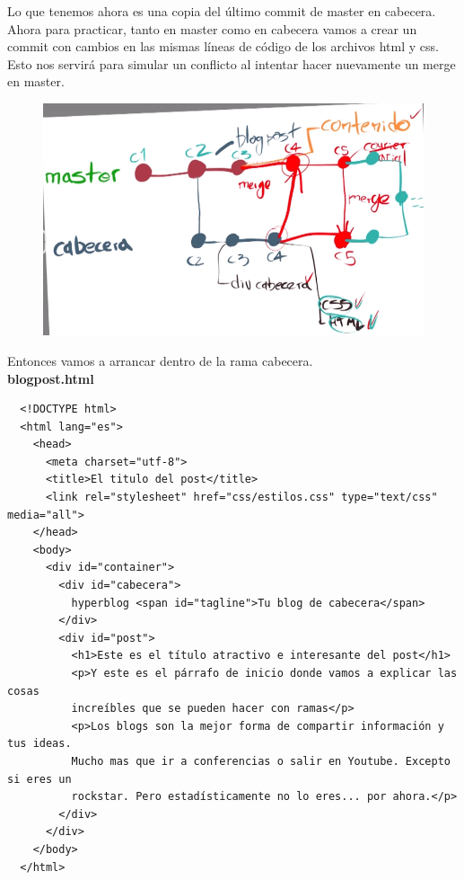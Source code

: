 \documentclass{article}
\begin{document}
Lo que tenemos ahora es una copia del último commit de master en cabecera.
Ahora para practicar, tanto en master como en cabecera vamos a crear un commit
con cambios en las mismas líneas de código de los archivos html y css. Esto nos
servirá para simular un conflicto al intentar hacer nuevamente un merge en
master.

\newpage

\begin{figure}[h!]
  \centering
  \includegraphics[scale=0.75]{./Pictures/171_commits_cabecera.png}
\end{figure}

Entonces vamos a arrancar dentro de la rama cabecera.\\

\textbf{blogpost.html}
\begin{verbatim}
  <!DOCTYPE html>
  <html lang="es">
    <head>
      <meta charset="utf-8">
      <title>El titulo del post</title>
      <link rel="stylesheet" href="css/estilos.css" type="text/css" media="all">
    </head>
    <body>
      <div id="container">
        <div id="cabecera">
          hyperblog <span id="tagline">Tu blog de cabecera</span>
        </div>
        <div id="post">
          <h1>Este es el título atractivo e interesante del post</h1>
          <p>Y este es el párrafo de inicio donde vamos a explicar las cosas
          increíbles que se pueden hacer con ramas</p>
          <p>Los blogs son la mejor forma de compartir información y tus ideas.
          Mucho mas que ir a conferencias o salir en Youtube. Excepto si eres un
          rockstar. Pero estadísticamente no lo eres... por ahora.</p>
        </div>
      </div>
    </body>
  </html>
\end{verbatim}
\end{document}
